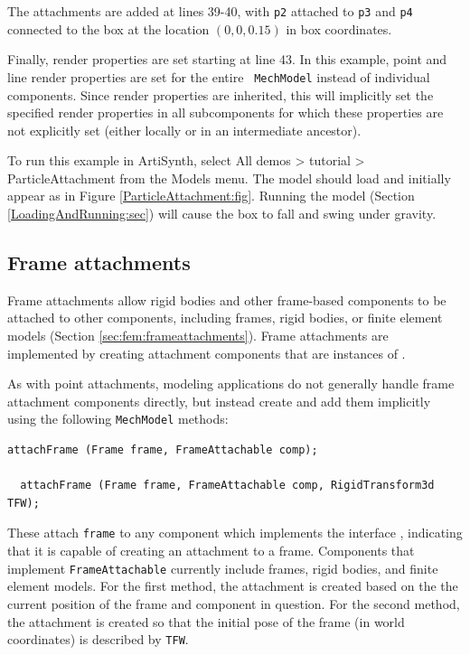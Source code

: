 The attachments are added at lines 39-40, with {\tt p2} attached to
{\tt p3} and {\tt p4} connected to the box at the location $(0, 0,
0.15)$ in box coordinates. 

Finally, render properties are set starting at line 43. In this
example, point and line render properties are set for the entire {\tt
MechModel} instead of individual components.  Since render properties
are inherited, this will implicitly set the specified render
properties in all subcomponents for which these properties are not
explicitly set (either locally or in an intermediate ancestor).

To run this example in ArtiSynth, select {\sf All demos > tutorial >
ParticleAttachment} from the {\sf Models} menu. The model should load
and initially appear as in Figure \ref{ParticleAttachment:fig}.
Running the model (Section \ref{LoadingAndRunning:sec}) will cause the
box to fall and swing under gravity.

\subsection{Frame attachments}
\label{sec:mech:frameattachments}

Frame attachments allow rigid bodies and other frame-based components to
be attached to other components, including frames, rigid
bodies, or finite element models (Section \ref{sec:fem:frameattachments}).
Frame attachments are implemented by creating attachment components that are
instances of .

As with point attachments, modeling applications do not generally
handle frame attachment components directly, but instead create and
add them
implicitly using the following {\tt MechModel} methods:
\begin{lstlisting}[]
  attachFrame (Frame frame, FrameAttachable comp);

  attachFrame (Frame frame, FrameAttachable comp, RigidTransform3d TFW);
\end{lstlisting}
%
These attach {\tt frame} to any component which implements the
interface ,
indicating that it is capable of creating an attachment to a
frame. Components that implement {\tt FrameAttachable} currently
include frames, rigid bodies, and finite element models.  For the
first method, the attachment is created based on the the current
position of the frame and component in question. For the second
method, the attachment is created so that the initial pose of the frame
(in world coordinates) is described by {\tt TFW}.

